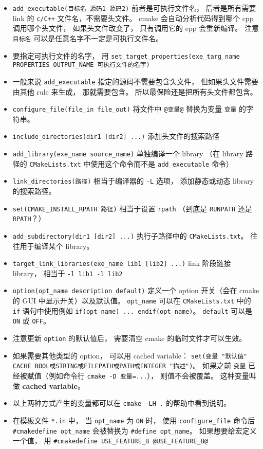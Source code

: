 \begin{itemize}
\item \verb`add_executable(目标名 源码1 源码2)` 前者是可执行文件名， 后者是所有需要 link 的 \verb`c/C++` 文件名，不需要头文件。 cmake 会自动分析代码得到哪个 cpp 调用哪个头文件， 如果头文件改变了， 只有调用它的 cpp 会重新编译。 注意 \verb`目标名` 可以是任意名字不一定是可执行文件名。
\item 要指定可执行文件的名字， 用 \verb`set_target_properties(exe_targ_name PROPERTIES OUTPUT_NAME 可执行文件的名字)`
\item 一般来说 \verb`add_executable` 指定的源码不需要包含头文件， 但如果头文件需要由其他 rule 来生成， 那就需要包含。 所以最保险还是把所有头文件都包含。
\item \verb`configure_file(file_in file_out)` 将文件中 \verb`@变量@` 替换为变量 \verb`变量` 的字符串。
\item \verb`include_directories(dir1 [dir2] ...)` 添加头文件的搜索路径
\item \verb`add_library(exe_name source_name)` 单独编译一个 library （在 library 路径的 \verb`CMakeLists.txt` 中使用这个命令而不是 \verb`add_executable` 命令）
\item \verb`link_directories(路径)` 相当于编译器的 \verb`-L` 选项， 添加静态或动态 library 的搜索路径。
\item \verb`set(CMAKE_INSTALL_RPATH 路径)` 相当于设置 \verb`rpath` （到底是 \verb`RUNPATH` 还是 \verb`RPATH`？）
\item \verb`add_subdirectory(dir1 [dir2] ...)` 执行子路径中的 \verb`CMakeLists.txt`。 往往用于编译某个 library。
\item \verb`target_link_libraries(exe_name lib1 [lib2] ...)` link 阶段链接 library， 相当于 \verb`-l lib1 -l lib2`
\item \verb`option(opt_name description default)` 定义一个 option 开关（会在 cmake 的 GUI 中显示开关）以及默认值。 \verb`opt_name` 可以在 \verb`CMakeLists.txt` 中的 \verb`if` 语句中使用例如 \verb`if(opt_name) ... endif(opt_name)`。 \verb`default` 可以是 \verb`ON` 或 \verb`OFF`。
\item 注意更新 \verb`option` 的默认值后， 需要清空 cmake 的临时文件才可以生效。
\item 如果需要其他类型的 option， 可以用 cached variable： \verb`set(变量 "默认值" CACHE BOOL或STRING或FILEPATH或PATH或INTEGER "描述")`。 如果之前 \verb`变量` 已经被赋值（例如命令行 \verb`cmake -D 变量=...`）， 则值不会被覆盖。 这种变量叫做 \textbf{cached variable}。
\item 以上两种方式产生的变量都可以在 \verb`cmake -LH .` 的帮助中看到说明。
\item 在模板文件 \verb`*.in` 中， 当 \verb`opt_name` 为 \verb`ON` 时， 使用 \verb`configure_file` 命令后 \verb`#cmakedefine opt_name` 会被替换为 \verb`#define opt_name`。 如果想要给宏定义一个值， 用 \verb`#cmakedefine USE_FEATURE_B @USE_FEATURE_B@`

\end{itemize}
